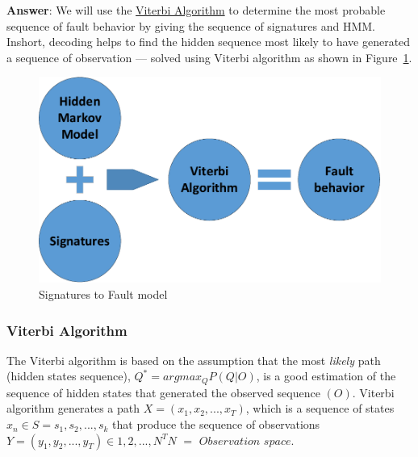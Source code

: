 \textbf{Answer}: We will use the \underline{Viterbi Algorithm} to determine the most probable sequence of fault behavior by giving the sequence of signatures and HMM. Inshort, decoding helps to find the hidden sequence most likely to have generated a sequence of observation --- solved using Viterbi algorithm as shown in Figure~\ref{fig:HMMsig-Vit}. 
\begin{figure}[tb!]
 \centering
  \captionsetup{justification=centering}    
   \includegraphics[scale=0.8]{Figures/HMM-plus-viterbi.pdf}
   \caption{Signatures to Fault model}
\label{fig:HMMsig-Vit}
\end{figure}
\subsubsection{Viterbi Algorithm}
The Viterbi algorithm is based on the assumption that the most \textit{likely} path (hidden states sequence), $Q^* = argmax_Q P(Q|O) $, is a good estimation of the sequence of hidden states that generated the observed sequence $(O)$. Viterbi algorithm generates a path $X = (x_1, x_2,...,x_T)$, which is a sequence of states $x_n \in S = {s_1, s_2,...,s_k}$ that produce the sequence of observations $Y = (y_1,y_2,...,y_T) \in {1,2,...,N}^T N$ $=$ $Observation$ $space$.


